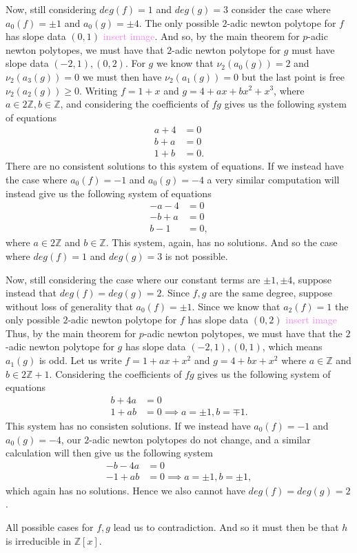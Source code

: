 \documentclass[12pt,letterpaper,boxed]{hmcpset}
\newcommand{\wg}[1]{\textcolor{violet}{#1}}
\newcommand{\Z}{\mathbb Z}
\begin{document}
\begin{solution}
\begin{itemize}
Now, still considering $deg(f) = 1$ and $deg(g) = 3$ consider the case
where $a_0(f) = \pm 1$ and $a_0(g) = \pm 4$. The only possible
$2$-adic newton polytope for $f$ has slope data $(0, 1)$
\wg{insert image}. And so, by the main theorem for $p$-adic newton
polytopes, we must have that $2$-adic newton polytope for $g$ must
have slope data $(-2, 1), (0, 2)$. For $g$ we know that $\nu_2(a_0(g))
= 2$ and $\nu_2(a_3(g)) = 0$ we must then have $\nu_2(a_1(g)) = 0$ but
the last point is free $\nu_2(a_2(g)) \geq 0$. Writing $f = 1 + x$ and
$g = 4 + ax + bx^2 + x^3$, where $a \in 2\Z, b \in \Z$,
 and considering the coefficients of $fg$ gives us the following
system of equations
\begin{align*}
	a + 4 &= 0 \\
	b + a &= 0 \\
	1 + b &= 0.
\end{align*}
There are no consistent solutions to this system of equations.
If we instead have the case where $a_0(f) = -1$ and $a_0(g) = -4$ a
very similar computation will instead give us the following system of
equations
\begin{align*}
	-a - 4 &= 0 \\
	-b + a &= 0 \\
	b - 1 &= 0,
\end{align*}
where $a \in 2\Z$ and $b \in \Z$. This system, again, has no
solutions. And so the case where $deg(f) = 1$ and $deg(g) = 3$ is not
possible.

Now, still considering the case where our constant terms are $\pm 1,
\pm 4$, suppose instead that $deg(f) = deg(g) = 2$. Since $f,g$ are
the same degree, suppose without loss of generality that $a_0(f) = \pm
1$. Since we know that $a_2(f) = 1$ the only possible $2$-adic newton
polytope for $f$ has slope data $(0,2)$
\wg{insert image}
Thus, by the main theorem for $p$-adic newton polytopes, we must have
that the $2$-adic newton polytope for $g$ has slope data $(-2,1),
(0,1)$, which means $a_1(g)$ is odd.
Let us write $f = 1 + ax + x^2$ and $g = 4 + bx + x^2$ where $a \in
\Z$ and $b \in 2\Z + 1$. Considering the coefficients of $fg$ gives us
the following system of equations 
\begin{align*}
	b + 4a &= 0 \\
	1 + ab &= 0 \implies a = \pm 1, b = \mp 1.
\end{align*}
This system has no consisten solutions.
If we instead have $a_0(f) = -1$ and $a_0(g) = -4$, our $2$-adic
newton polytopes do not change, and a similar calculation will then
give us the following system
\begin{align*}
	-b -4a &= 0 \\
	-1 + ab &= 0 \implies a = \pm 1, b = \pm 1,
\end{align*}
which again has no solutions. Hence we also cannot have $deg(f) =
deg(g) = 2$. 

All possible cases for $f,g$ lead us to contradiction. And so it must
then be that $h$ is irreducible in $\Z[x]$. 



\end{itemize}
\end{solution}
\end{document}
